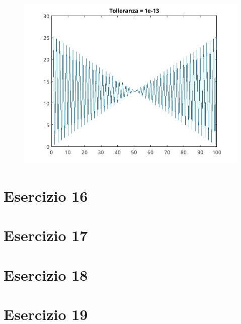 \documentclass[10pt,a4paper]{article}
\begin{document}
\begin{figure}[]
  \centering
  \includegraphics[width=1\textwidth]{../figure/15/tol1e-13.jpg}    
\end{figure}
\pagebreak
\section*{Esercizio 16}

\section*{Esercizio 17}
\section*{Esercizio 18}
\section*{Esercizio 19}
\end{document}

